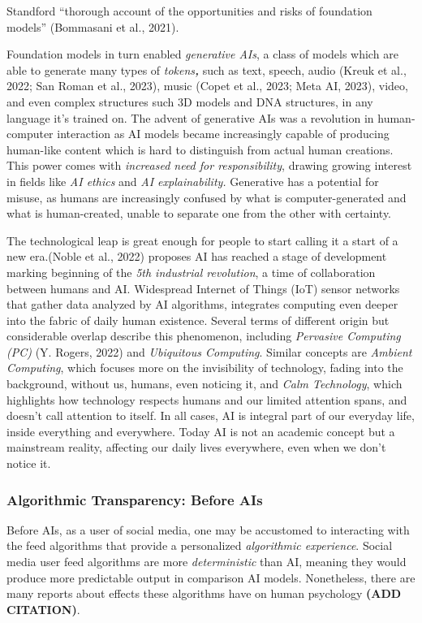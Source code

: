\documentclass[
  letterpaper,
  DIV=11,
  numbers=noendperiod]{scrartcl}
\begin{document}
Standford ``thorough account of the opportunities and risks of
foundation models'' (Bommasani et al., 2021).

Foundation models in turn enabled \emph{generative AIs}, a class of
models which are able to generate many types of \emph{tokens\textbf{,}}
such as text, speech, audio (Kreuk et al., 2022; San Roman et al.,
2023), music (Copet et al., 2023; Meta AI, 2023), video, and even
complex structures such 3D models and DNA structures, in any language
it's trained on. The advent of generative AIs was a revolution in
human-computer interaction as AI models became increasingly capable of
producing human-like content which is hard to distinguish from actual
human creations. This power comes with \emph{increased need for
responsibility}, drawing growing interest in fields like \emph{AI
ethics} and \emph{AI explainability.} Generative has a potential for
misuse, as humans are increasingly confused by what is
computer-generated and what is human-created, unable to separate one
from the other with certainty.

The technological leap is great enough for people to start calling it a
start of a new era.(Noble et al., 2022) proposes AI has reached a stage
of development marking beginning of the \emph{5th industrial
revolution}, a time of collaboration between humans and AI. Widespread
Internet of Things (IoT) sensor networks that gather data analyzed by AI
algorithms, integrates computing even deeper into the fabric of daily
human existence. Several terms of different origin but considerable
overlap describe this phenomenon, including \emph{Pervasive Computing
(PC)} (Y. Rogers, 2022) and \emph{Ubiquitous Computing}. Similar
concepts are \emph{Ambient Computing}, which focuses more on the
invisibility of technology, fading into the background, without us,
humans, even noticing it, and \emph{Calm Technology}, which highlights
how technology respects humans and our limited attention spans, and
doesn't call attention to itself. In all cases, AI is integral part of
our everyday life, inside everything and everywhere. Today AI is not an
academic concept but a mainstream reality, affecting our daily lives
everywhere, even when we don't notice it.

\subsubsection{Algorithmic Transparency: Before
AIs}\label{algorithmic-transparency-before-ais}

Before AIs, as a user of social media, one may be accustomed to
interacting with the feed algorithms that provide a personalized
\emph{algorithmic experience}. Social media user feed algorithms are
more \emph{deterministic} than AI, meaning they would produce more
predictable output in comparison AI models. Nonetheless, there are many
reports about effects these algorithms have on human psychology
\textbf{(ADD CITATION)}.
\end{document}
